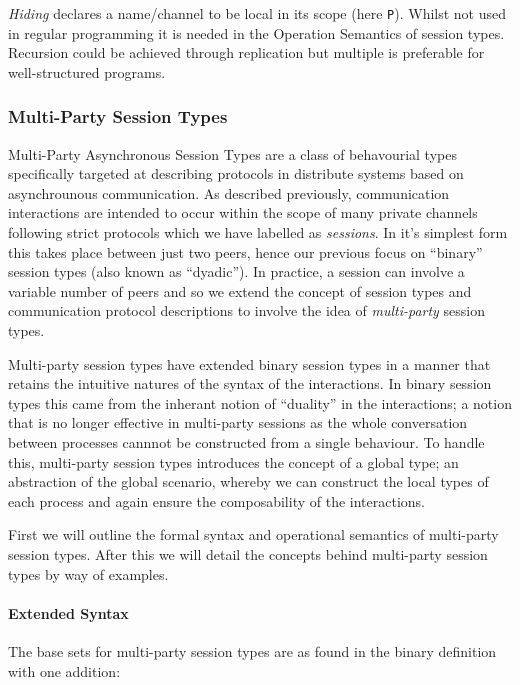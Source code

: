 \documentclass[11pt]{scrartcl}
\begin{document}
\emph{Hiding} declares a name/channel to be local in its scope (here 
\texttt{P}). Whilst not used in regular programming it is needed in the 
Operation Semantics of session types. Recursion could be achieved through 
replication but multiple is preferable for well-structured programs.



\subsubsection{Multi-Party Session Types}
Multi-Party Asynchronous Session Types are a class of behavourial types
specifically targeted at describing protocols in distribute systems
based on asynchrounous communication\cite{CCPY15}. As described previously,
communication interactions are intended to occur within the scope of many
private channels following strict protocols which we have labelled as
\emph{sessions}. In it's simplest form this takes place between just two
peers, hence our previous focus on ``binary'' session types (also known as
``dyadic''). In practice, a session can involve a variable number of peers
and so we extend the concept of session types and communication protocol
descriptions to involve the idea of \emph{multi-party} session types.

Multi-party session types have extended binary session types in a manner
that retains the intuitive natures of the syntax of the interactions. In
binary session types this came from the inherant notion of ``duality'' in
the interactions; a notion that is no longer effective in multi-party 
sessions as the whole conversation between processes cannnot be constructed
from a single behaviour. To handle this, multi-party session types
introduces the concept of a global type; an abstraction of the global
scenario, whereby we can construct the local types of each process and
again ensure the composability of the interactions\cite{HYC08}. 

First we will outline the formal syntax and operational semantics of 
multi-party session types. After this we will detail the concepts behind 
multi-party session types by way of examples.

\paragraph{Extended Syntax}
The base sets for multi-party session types are as found in the binary
definition with one addition:
\end{document}
